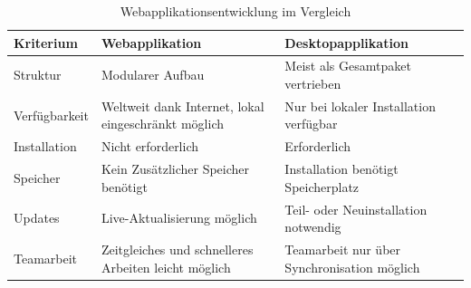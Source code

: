 \begin{table}[H]
	\centering
	\caption{Webapplikationsentwicklung im Vergleich \cite{TecArt-GmbH2019:online}}
	\label{tab:spektrometer}
	\begin{tabular}{l | p{5cm}|  p{5cm}}
		\textbf{Kriterium} & \textbf{Webapplikation} & \textbf{Desktopapplikation}   \\ 
		\hline 
		Struktur & Modularer Aufbau & Meist als Gesamtpaket vertrieben \\
		\hline 
		Verfügbarkeit & Weltweit dank Internet, lokal eingeschränkt möglich & Nur bei lokaler Installation verfügbar \\ 
		\hline 
		Installation	& Nicht erforderlich & Erforderlich   \\ 
		\hline
		Speicher & Kein Zusätzlicher Speicher benötigt & Installation benötigt Speicherplatz \\
		\hline 
		Updates & Live-Aktualisierung möglich & Teil- oder Neuinstallation notwendig \\		
		\hline 
		Teamarbeit & Zeitgleiches und schnelleres Arbeiten leicht möglich & Teamarbeit nur über Synchronisation möglich \\
		\hline 
	\end{tabular} 
\end{table}

